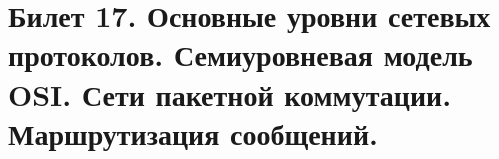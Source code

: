 \newpage
\section {Билет 17. Основные уровни сетевых протоколов. Семиуровневая модель OSI. Сети пакетной коммутации. Маршрутизация сообщений.}